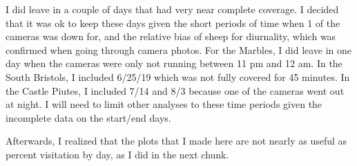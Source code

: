 \documentclass[]{article}
\begin{document}
I did leave in a couple of days that had very near complete coverage. I
decided that it was ok to keep these days given the short periods of
time when 1 of the cameras was down for, and the relative bias of sheep
for diurnality, which was confirmed when going through camera photos.
For the Marbles, I did leave in one day when the cameras were only not
running between 11 pm and 12 am. In the South Bristols, I included
6/25/19 which was not fully covered for 45 minutes. In the Castle
Piutes, I included 7/14 and 8/3 because one of the cameras went out at
night. I will need to limit other analyses to these time periods given
the incomplete data on the start/end days.

Afterwards, I realized that the plots that I made here are not nearly as
useful as percent visitation by day, as I did in the next chunk.
\end{document}
